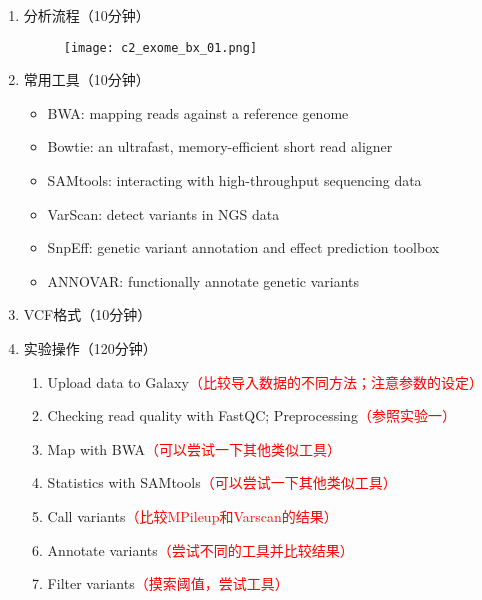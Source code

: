 \documentclass{TIJMUjiaoanSY}
\begin{document}
\noindent
\begin{enumerate}
  \item 分析流程（10分钟）
    \begin{figure}[ht]
      \centering
      \texttt{[image: c2\_exome\_bx\_01.png]}
    \end{figure}

  \item 常用工具（10分钟）
    \begin{itemize}
      \item BWA: mapping reads against a reference genome
      \item Bowtie: an ultrafast, memory-efficient short read aligner
      \item SAMtools: interacting with high-throughput sequencing data
      \item VarScan: detect variants in NGS data
      \item SnpEff: genetic variant annotation and effect prediction toolbox
      \item ANNOVAR: functionally annotate genetic variants
    \end{itemize}

  \item VCF格式（10分钟）

  \item 实验操作（120分钟）
    \begin{enumerate}
      \item Upload data to Galaxy\textcolor{red}{（比较导入数据的不同方法；注意参数的设定）}
      \item Checking read quality with FastQC; Preprocessing\textcolor{red}{（参照实验一）}
      \item Map with BWA\textcolor{red}{（可以尝试一下其他类似工具）}
      \item Statistics with SAMtools\textcolor{red}{（可以尝试一下其他类似工具）}
      \item Call variants\textcolor{red}{（比较MPileup和Varscan的结果）}
      \item Annotate variants\textcolor{red}{（尝试不同的工具并比较结果）}
      \item Filter variants\textcolor{red}{（摸索阈值，尝试工具）}
    \end{enumerate}
\end{enumerate}


\otherTail
\end{document}
